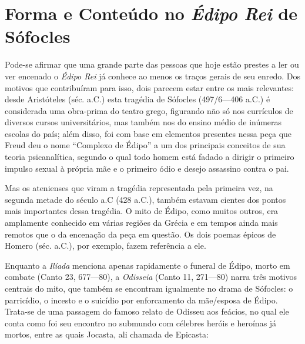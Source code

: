 \label{introduuxe7uxe3o}

\section{Forma e Conteúdo no \emph{Édipo Rei} de Sófocles}

Pode-se afirmar que uma grande parte das pessoas que hoje estão prestes
a ler ou ver encenado o \emph{Édipo Rei} já conhece ao menos os traços
gerais de seu enredo. Dos motivos que contribuíram para isso, dois
parecem estar entre os mais relevantes: desde Aristóteles (séc.  a.C.) 
esta tragédia de Sófocles (497/6---406 a.C.) é considerada uma
obra-prima do teatro grego, figurando não só nos currículos de diversos
cursos universitários, mas também nos do ensino médio de inúmeras
escolas do país; além disso, foi com base em elementos presentes nessa
peça que Freud deu o nome ``Complexo de Édipo'' a um dos principais
conceitos de sua teoria psicanalítica, segundo o qual todo homem está
fadado a dirigir o primeiro impulso sexual à própria mãe e o primeiro
ódio e desejo assassino contra o pai.

Mas os atenienses que viram a tragédia representada pela primeira vez,
na segunda metade do século  a.C (428 a.C.), também estavam cientes
dos pontos mais importantes dessa tragédia. O mito de Édipo, como muitos
outros, era amplamente conhecido em várias regiões da Grécia e em tempos
ainda mais remotos que o da encenação da peça em questão. Os dois poemas
épicos de Homero (séc.  a.C.), por exemplo, fazem referência a ele.

Enquanto a \emph{Ilíada} menciona apenas rapidamente o funeral de Édipo,
morto em combate (Canto 23, 677---80), a \emph{Odisseia} (Canto 11,
271---80) narra três motivos centrais do mito, que também se encontram
igualmente no drama de Sófocles: o parricídio, o incesto e o suicídio
por enforcamento da mãe/esposa de Édipo. Trata-se de uma passagem do
famoso relato de Odisseu aos feácios, no qual ele conta como foi seu
encontro no submundo com célebres heróis e heroínas já mortos, entre as
quais Jocasta, ali chamada de Epicasta:


